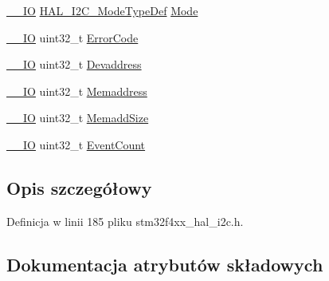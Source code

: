 \begin{DoxyCompactItemize}
\item 
\hyperlink{core__sc300_8h_aec43007d9998a0a0e01faede4133d6be}{\+\_\+\+\_\+\+IO} \hyperlink{group___h_a_l__mode__structure__definition_gabcbb7b844f2ffd63c4e530c117882062}{H\+A\+L\+\_\+\+I2\+C\+\_\+\+Mode\+Type\+Def} \hyperlink{struct_____i2_c___handle_type_def_a9e1687f431eaba605b2ae49c1e3ff641}{Mode}
\item 
\hyperlink{core__sc300_8h_aec43007d9998a0a0e01faede4133d6be}{\+\_\+\+\_\+\+IO} uint32\+\_\+t \hyperlink{struct_____i2_c___handle_type_def_a824099e364465827123cda831284f643}{Error\+Code}
\item 
\hyperlink{core__sc300_8h_aec43007d9998a0a0e01faede4133d6be}{\+\_\+\+\_\+\+IO} uint32\+\_\+t \hyperlink{struct_____i2_c___handle_type_def_a7517a9738c41067d8facfb4dea6f4ff3}{Devaddress}
\item 
\hyperlink{core__sc300_8h_aec43007d9998a0a0e01faede4133d6be}{\+\_\+\+\_\+\+IO} uint32\+\_\+t \hyperlink{struct_____i2_c___handle_type_def_a4261371469c7df0bc57a71949a7e1f75}{Memaddress}
\item 
\hyperlink{core__sc300_8h_aec43007d9998a0a0e01faede4133d6be}{\+\_\+\+\_\+\+IO} uint32\+\_\+t \hyperlink{struct_____i2_c___handle_type_def_a7b08b0e13a121ee8c59e868e30a8b9ab}{Memadd\+Size}
\item 
\hyperlink{core__sc300_8h_aec43007d9998a0a0e01faede4133d6be}{\+\_\+\+\_\+\+IO} uint32\+\_\+t \hyperlink{struct_____i2_c___handle_type_def_a585f68fb576ac0b98ecb37ae86d964f2}{Event\+Count}
\end{DoxyCompactItemize}


\subsection{Opis szczegółowy}


Definicja w linii 185 pliku stm32f4xx\+\_\+hal\+\_\+i2c.\+h.



\subsection{Dokumentacja atrybutów składowych}
\mbox{\label{struct_____i2_c___handle_type_def_a7517a9738c41067d8facfb4dea6f4ff3}} 
